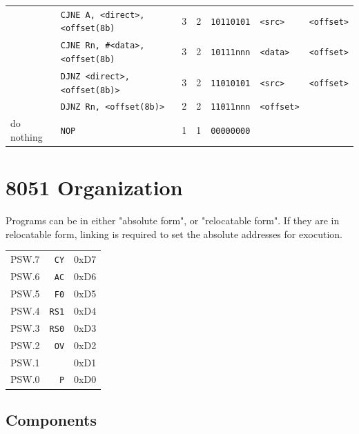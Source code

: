 \documentclass[journal]{IEEEtran}
\begin{document}
{{\begin{tabular}{|l|l|l|l|l|l|l|}
		& \texttt{CJNE A, <direct>, <offset(8b)} & 3 & 2 & \texttt{10110101} & \texttt{<src>} & \texttt{<offset>} \\
		& \texttt{CJNE Rn, \#<data>, <offset(8b)} & 3 & 2 & \texttt{10111nnn} & \texttt{<data>} & \texttt{<offset>} \\
		& \texttt{DJNZ <direct>, <offset(8b)>} & 3 & 2 & \texttt{11010101} & \texttt{<src>} & \texttt{<offset>} \\
		& \texttt{DJNZ Rn, <offset(8b)>} & 2 & 2 & \texttt{11011nnn} & \texttt{<offset>} & \\
		\hline
		do nothing
		& \texttt{NOP} & 1 & 1 & \texttt{00000000} & & \\
		\hline
	\end{tabular}
} %


\section{8051 Organization}
Programs can be in either "absolute form", or "relocatable form".
If they are in relocatable form,
linking is required to set the absolute addresses for exocution.

\begin{center}
	\begin{tabular}{c r|l}
		PSW.7 & \texttt{CY} & 0xD7 \\
		PSW.6 & \texttt{AC} & 0xD6 \\
		PSW.5 & \texttt{F0} & 0xD5 \\
		PSW.4 & \texttt{RS1} & 0xD4\\
		PSW.3 & \texttt{RS0} & 0xD3\\
		PSW.2 & \texttt{OV} & 0xD2\\
		PSW.1 & & 0xD1\\
		PSW.0 & \texttt{P} & 0xD0\\
	\end{tabular}
\end{center}

\subsection{Components}

}
\end{document}
